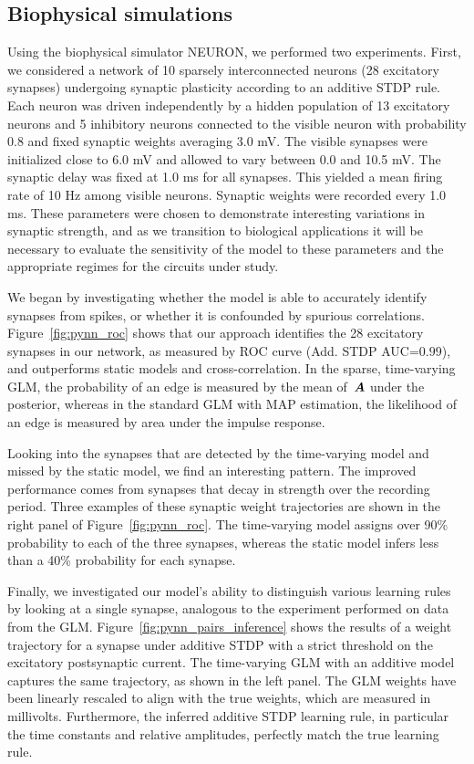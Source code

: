 \subsection{Biophysical simulations}
Using the biophysical simulator NEURON, we performed two experiments. First, we considered a network of 10 sparsely interconnected neurons (28 excitatory synapses) undergoing synaptic plasticity according to an additive STDP rule. Each neuron was driven independently by a hidden population of 13 excitatory neurons and 5 inhibitory neurons connected to the visible neuron with probability 0.8 and fixed synaptic weights averaging 3.0 mV. The visible synapses were initialized close to 6.0 mV and allowed to vary between 0.0 and 10.5 mV. The synaptic delay was fixed at 1.0 ms for all synapses. This yielded a mean firing rate of 10 Hz among visible neurons. Synaptic weights were recorded every 1.0 ms. 
These parameters were chosen to demonstrate interesting variations in synaptic strength, and as we transition to biological applications it will be necessary to evaluate the sensitivity of the model to these parameters and the appropriate regimes for the circuits under study.

We began by investigating whether the model is able to accurately identify synapses from spikes, or whether it is confounded by spurious correlations.  Figure~\ref{fig:pynn_roc} shows that our approach identifies the 28 excitatory synapses in our network, as measured by ROC curve (Add. STDP AUC=${0.99}$), and
outperforms static models and cross-correlation.  In the sparse, time-varying GLM, the probability of an edge is measured by the mean of~$\boldsymbol{A}$ under the posterior, whereas in the standard GLM with MAP estimation, the likelihood of an edge is measured by area under the impulse response. 

Looking into the synapses that are detected by the time-varying model and missed by the static model, we find an interesting pattern. The improved performance comes from synapses that decay in strength over the recording period. Three examples of these synaptic weight trajectories are shown in the right panel of Figure~\ref{fig:pynn_roc}. The time-varying model assigns over 90\% probability to each of the three synapses, whereas the static model infers less than a 40\% probability for each synapse.

Finally, we investigated our model's ability to distinguish various learning rules by looking at a single synapse, analogous to the experiment performed on data from the GLM. Figure~\ref{fig:pynn_pairs_inference} shows the results of a weight trajectory for a synapse under additive STDP with a strict threshold on the excitatory postsynaptic current. The time-varying GLM with an additive model captures the same trajectory, as shown in the left panel. The GLM weights have been linearly rescaled to align with the true weights, which are measured in millivolts. Furthermore, the inferred additive STDP learning rule, in particular the time constants and relative amplitudes, perfectly match the true learning rule. 

